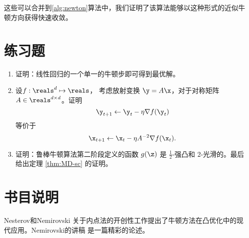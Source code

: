 这些可以合并到\ref{alg:newton}算法中，我们证明了该算法能够以这种形式的近似牛顿方向获得快速收敛。



\newpage
\section{
    练习题
    }

\begin{enumerate}

\item
证明：线性回归的一个单一的牛顿步即可得到最优解。

\item
设$f :\reals^d \mapsto \reals$， 考虑放射变换 $\y = A \x$，对于对称矩阵$A \in \reals^{d \times d}$。证明
$$ \y_{t+1} \leftarrow \y_t - \eta \nabla f(\y_t)$$
等价于
$$ \x_{t+1} \leftarrow \x_t - \eta A^{-2} \nabla f(\x_t) .$$

\item
证明：鲁棒牛顿算法第二阶段定义的函数 $g(\z)$ 是 $\frac{1}{2}$-强凸和 $2$-光滑的。最后给出定理 \ref{thm:MD-sc} 的证明。


\end{enumerate}





\newpage
\section{
    书目说明
    }


Nesterov和Nemirovski \cite{NesterovNemirovskii94siam}关于内点法的开创性工作提出了牛顿方法在凸优化中的现代应用。Nemirovski的讲稿 \cite{NemirovskiBook} 是一篇精彩的论述。

